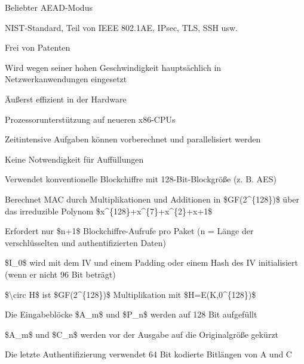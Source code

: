\documentclass[a4paper]{article}
\begin{document}
\begin{multicols}{3}
      \begin{itemize*}
            \item Beliebter AEAD-Modus
            \item NIST-Standard, Teil von IEEE 802.1AE, IPsec, TLS, SSH usw.
            \item Frei von Patenten
            \item Wird wegen seiner hohen Geschwindigkeit hauptsächlich in
            Netzwerkanwendungen eingesetzt
            \begin{itemize*}
                  \item Äußerst effizient in der Hardware
                  \item Prozessorunterstützung auf neueren x86-CPUs
                  \item Zeitintensive Aufgaben können vorberechnet und parallelisiert werden
                  \item Keine Notwendigkeit für Auffüllungen
            \end{itemize*}
            \item Verwendet konventionelle Blockchiffre mit 128-Bit-Blockgröße (z. B.
            AES)
            \item Berechnet MAC durch Multiplikationen und Additionen in
            \$GF(2\^{}\{128\})\$ über das irreduzible Polynom
            \$x\^{}\{128\}+x\^{}\{7\}+x\^{}\{2\}+x+1\$
            \item Erfordert nur \$n+1\$ Blockchiffre-Aufrufe pro Paket (n = Länge der
            verschlüsselten und authentifizierten Daten)
            \begin{itemize*}
                  \item \$I\_0\$ wird mit dem IV und einem Padding oder einem Hash des IV initialisiert (wenn er nicht 96 Bit beträgt)
                  \item \$\textbackslash circ H\$ ist \$GF(2\^{}\{128\})\$ Multiplikation mit \$H=E(K,0\^{}\{128\})\$
                  \item Die Eingabeblöcke \$A\_m\$ und \$P\_n\$ werden auf 128 Bit aufgefüllt
                  \item \$A\_m\$ und \$C\_n\$ werden vor der Ausgabe auf die Originalgröße gekürzt
                  \item Die letzte Authentifizierung verwendet 64 Bit kodierte Bitlängen von A und C
            \end{itemize*}

\end{itemize*}
\end{multicols}
\end{document}
